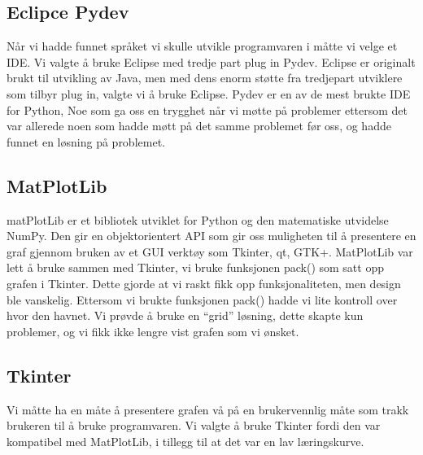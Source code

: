 \subsection{Eclipce Pydev}
Når vi hadde funnet språket vi skulle utvikle programvaren i måtte vi velge et IDE. Vi valgte å bruke Eclipse med tredje part plug in Pydev. Eclipse er originalt brukt til utvikling av Java, men med dens enorm støtte fra tredjepart utviklere som tilbyr plug in, valgte vi å bruke Eclipse. Pydev er en av de mest brukte IDE for Python, Noe som ga oss en trygghet når vi møtte på problemer ettersom det var allerede noen som hadde møtt på det samme problemet før oss, og hadde funnet en løsning på problemet.


\subsection{MatPlotLib}
matPlotLib er et bibliotek utviklet for Python og den matematiske utvidelse NumPy. Den gir en objektorientert API som gir oss muligheten til å presentere en graf gjennom bruken av et GUI verktøy som Tkinter, qt, GTK+. MatPlotLib var lett å bruke sammen med Tkinter, vi bruke funksjonen pack() som satt opp grafen i Tkinter. Dette gjorde at vi raskt fikk opp funksjonaliteten, men design ble vanskelig. Ettersom vi brukte funksjonen pack() hadde vi lite kontroll over hvor den havnet. Vi prøvde å bruke en “grid” løsning, dette skapte kun problemer, og vi fikk ikke lengre vist grafen som vi ønsket.


\subsection{Tkinter}
Vi måtte ha en måte å presentere grafen vå på en brukervennlig måte som trakk brukeren til å bruke programvaren. Vi valgte å bruke Tkinter fordi den var kompatibel med MatPlotLib, i tillegg til at det var en lav læringskurve.